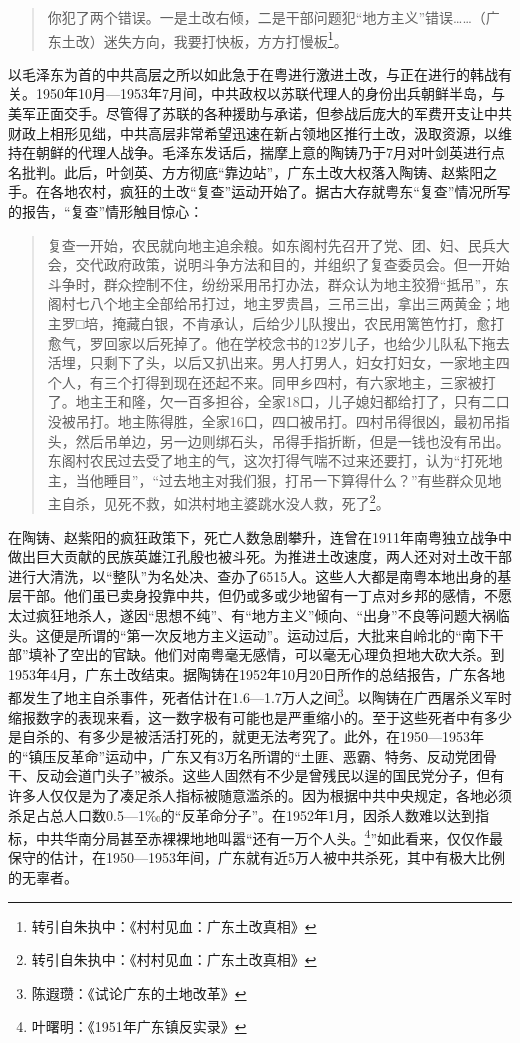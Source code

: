 \begin{quote}
你犯了两个错误。一是土改右倾，二是干部问题犯“地方主义”错误……（广东土改）迷失方向，我要打快板，方方打慢板\footnote{转引自朱执中：《村村见血：广东土改真相》}。
\end{quote}

以毛泽东为首的中共高层之所以如此急于在粤进行激进土改，与正在进行的韩战有关。1950年10月—1953年7月间，中共政权以苏联代理人的身份出兵朝鲜半岛，与美军正面交手。尽管得了苏联的各种援助与承诺，但参战后庞大的军费开支让中共财政上相形见绌，中共高层非常希望迅速在新占领地区推行土改，汲取资源，以维持在朝鲜的代理人战争。毛泽东发话后，揣摩上意的陶铸乃于7月对叶剑英进行点名批判。此后，叶剑英、方方彻底“靠边站”，广东土改大权落入陶铸、赵紫阳之手。在各地农村，疯狂的土改“复查”运动开始了。据古大存就粤东“复查”情况所写的报告，“复查”情形触目惊心：

\begin{quote}
复查一开始，农民就向地主追余粮。如东阁村先召开了党、团、妇、民兵大会，交代政府政策，说明斗争方法和目的，并组织了复查委员会。但一开始斗争时，群众控制不住，纷纷采用吊打办法，群众认为地主狡猾“抵吊”，东阁村七八个地主全部给吊打过，地主罗贵昌，三吊三出，拿出三两黄金；地主罗□培，掩藏白银，不肯承认，后给少儿队搜出，农民用篱笆竹打，愈打愈气，罗回家以后死掉了。他在学校念书的12岁儿子，也给少儿队私下拖去活埋，只剩下了头，以后又扒出来。男人打男人，妇女打妇女，一家地主四个人，有三个打得到现在还起不来。同甲乡四村，有六家地主，三家被打了。地主王和隆，欠一百多担谷，全家18口，儿子媳妇都给打了，只有二口没被吊打。地主陈得胜，全家16口，四口被吊打。四村吊得很凶，最初吊指头，然后吊单边，另一边则绑石头，吊得手指折断，但是一钱也没有吊出。东阁村农民过去受了地主的气，这次打得气喘不过来还要打，认为“打死地主，当他睡目”，“过去地主对我们狠，打吊一下算得什么？”有些群众见地主自杀，见死不救，如洪村地主婆跳水没人救，死了\footnote{转引自朱执中：《村村见血：广东土改真相》}。
\end{quote}

在陶铸、赵紫阳的疯狂政策下，死亡人数急剧攀升，连曾在1911年南粤独立战争中做出巨大贡献的民族英雄江孔殷也被斗死。为推进土改速度，两人还对对土改干部进行大清洗，以“整队”为名处决、查办了6515人。这些人大都是南粤本地出身的基层干部。他们虽已卖身投靠中共，但仍或多或少地留有一丁点对乡邦的感情，不愿太过疯狂地杀人，遂因“思想不纯”、有“地方主义”倾向、“出身”不良等问题大祸临头。这便是所谓的“第一次反地方主义运动”。运动过后，大批来自岭北的“南下干部”填补了空出的官缺。他们对南粤毫无感情，可以毫无心理负担地大砍大杀。到1953年4月，广东土改结束。据陶铸在1952年10月20日所作的总结报告，广东各地都发生了地主自杀事件，死者估计在1.6—1.7万人之间\footnote{陈遐瓒：《试论广东的土地改革》}。以陶铸在广西屠杀义军时缩报数字的表现来看，这一数字极有可能也是严重缩小的。至于这些死者中有多少是自杀的、有多少是被活活打死的，就更无法考究了。此外，在1950—1953年的“镇压反革命”运动中，广东又有3万名所谓的“土匪、恶霸、特务、反动党团骨干、反动会道门头子”被杀。这些人固然有不少是曾残民以逞的国民党分子，但有许多人仅仅是为了凑足杀人指标被随意滥杀的。因为根据中共中央规定，各地必须杀足占总人口数0.5—1‰的“反革命分子”。在1952年1月，因杀人数难以达到指标，中共华南分局甚至赤裸裸地地叫嚣“还有一万个人头。\footnote{叶曙明：《1951年广东镇反实录》}”如此看来，仅仅作最保守的估计，在1950—1953年间，广东就有近5万人被中共杀死，其中有极大比例的无辜者。

